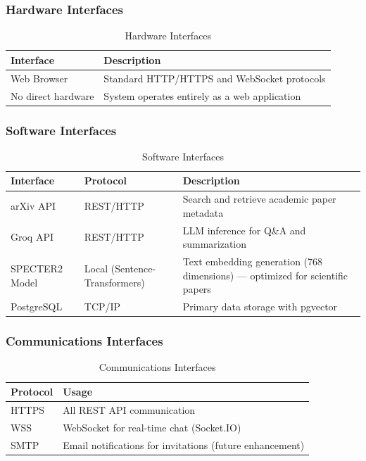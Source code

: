 \documentclass[11pt,a4paper]{article}
\begin{document}
\subsubsection{Hardware Interfaces}

\begin{table}[H]
\centering
\begin{tabular}{p{4cm}p{9cm}}
\toprule
\textbf{Interface} & \textbf{Description} \\
\midrule
Web Browser & Standard HTTP/HTTPS and WebSocket protocols \\
No direct hardware & System operates entirely as a web application \\
\bottomrule
\end{tabular}
\caption{Hardware Interfaces}
\end{table}

\subsubsection{Software Interfaces}

\begin{table}[H]
\centering
\begin{tabular}{p{3cm}p{3cm}p{7cm}}
\toprule
\textbf{Interface} & \textbf{Protocol} & \textbf{Description} \\
\midrule
arXiv API & REST/HTTP & Search and retrieve academic paper metadata \\
Groq API & REST/HTTP & LLM inference for Q\&A and summarization \\
SPECTER2 Model & Local (Sentence-Transformers) & Text embedding generation (768 dimensions) --- optimized for scientific papers \\
PostgreSQL & TCP/IP & Primary data storage with pgvector \\
\bottomrule
\end{tabular}
\caption{Software Interfaces}
\end{table}

\subsubsection{Communications Interfaces}

\begin{table}[H]
\centering
\begin{tabular}{p{3cm}p{10cm}}
\toprule
\textbf{Protocol} & \textbf{Usage} \\
\midrule
HTTPS & All REST API communication \\
WSS & WebSocket for real-time chat (Socket.IO) \\
SMTP & Email notifications for invitations (future enhancement) \\
\bottomrule
\end{tabular}
\caption{Communications Interfaces}
\end{table}
\end{document}

